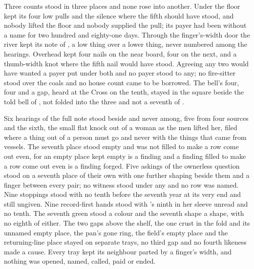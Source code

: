 Three counts stood in three places and none rose into another. Under the floor  kept its four low pulls and the silence where the fifth should have stood, and nobody lifted the floor and nobody supplied the pull; its payer had been without a name for two hundred and eighty-one days. Through the finger's-width door the river kept its note of , a low thing over a lower thing, never numbered among the hearings. Overhead  kept four nails on the near board, four on the next, and a thumb-width knot where the fifth nail would have stood. Agreeing any two would have wanted a payer put under both and no payer stood to any; no fire-sitter stood over the coals and no house count came to be borrowed. The bell's four, four and a gap, heard at the Cross on the tenth, stayed in the square beside the told bell of , not folded into the three and not a seventh of .

Six hearings of the full note stood beside and never among, five from four sources and the sixth, the small flat knock out of a woman as the men lifted her, filed where a thing out of a person must go and never with the things that came from vessels. The seventh place stood empty and was not filled to make a row come out even, for an empty place kept empty is a finding and a finding filled to make a row come out even is a finding forged. Five askings of the ownerless question stood on a seventh place of their own with one further shaping beside them and a finger between every pair; no witness stood under any and no row was named. Nine stoppings stood with no tenth before the seventh year at its very end and still ungiven. Nine record-first hands stood with 's ninth in her sleeve unread and no tenth. The seventh green stood a colour and the seventh shape a shape, with no eighth of either. The two gaps above the shelf, the one crust in the fold and its unnamed empty place, the pan's gone ring, the field's empty place and the returning-line place stayed on separate trays, no third gap and no fourth likeness made a cause. Every tray kept its neighbour parted by a finger's width, and nothing was opened, named, called, paid or ended.

